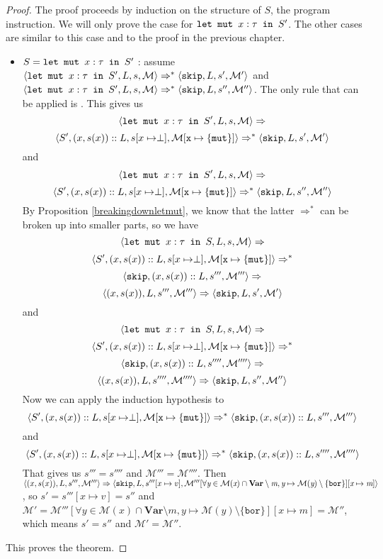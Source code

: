 \begin{proof}
The proof proceeds by induction on the structure of $S$, the program instruction. We will only prove the case for $\texttt{let mut }x : \tau \texttt{ in } S'$. The other cases are similar to this case and to the proof in the previous chapter. 
\begin{itemize}[noitemsep]
    
    \item $S = \texttt{let mut }x : \tau \texttt{ in } S'$ : assume $\langle \texttt{let mut }x : \tau \texttt{ in } S', L, s, \mathcal{M} \rangle \Rightarrow ^{*} \langle \texttt{skip}, L, s', \mathcal{M'} \rangle$ and $\langle \texttt{let mut }x : \tau \texttt{ in } S', L, s, \mathcal{M} \rangle \Rightarrow ^{*} \langle \texttt{skip}, L, s'', \mathcal{M''} \rangle$. The only rule that can be applied is . This gives us
    $$\langle \texttt{let mut }x : \tau \texttt{ in } S', L, s, \mathcal{M} \rangle \Rightarrow $$
    $$\langle S', (x,s(x))::L, s[x\mapsto \perp], \mathcal{M[\texttt{x}\mapsto\{\texttt{mut}\}]} \rangle \Rightarrow ^{*} \langle \texttt{skip}, L, s', \mathcal{M'} \rangle$$
    and 
    $$\langle \texttt{let mut }x : \tau \texttt{ in } S', L, s, \mathcal{M} \rangle \Rightarrow $$
    $$\langle S', (x,s(x))::L, s[x\mapsto \perp], \mathcal{M[\texttt{x}\mapsto\{\texttt{mut}\}]} \rangle \Rightarrow ^{*} \langle \texttt{skip}, L, s'', \mathcal{M''} \rangle$$
    By Proposition \ref{breakingdownletmut}, we know that the latter $\Rightarrow ^{*}$ can be broken up into smaller parts, so we have 
    $$\langle \texttt{let mut }x : \tau \texttt{ in } S, L, s, \mathcal{M} \rangle \Rightarrow $$
    $$\langle S', (x,s(x))::L, s[x\mapsto \perp], \mathcal{M[\texttt{x}\mapsto\{\texttt{mut}\}]} \rangle \Rightarrow ^{*}$$ $$\langle \texttt{skip}, (x,s(x))::L, s''', \mathcal{M'''} \rangle \Rightarrow$$ $$\langle (x,s(x)), L, s''', \mathcal{M'''} \rangle \Rightarrow \langle \texttt{skip}, L, s', \mathcal{M'} \rangle$$
    and 
    $$\langle \texttt{let mut }x : \tau \texttt{ in } S, L, s, \mathcal{M} \rangle \Rightarrow $$
    $$\langle S', (x,s(x))::L, s[x\mapsto \perp], \mathcal{M[\texttt{x}\mapsto\{\texttt{mut}\}]} \rangle \Rightarrow ^{*}$$ $$\langle \texttt{skip}, (x,s(x))::L, s'''', \mathcal{M''''} \rangle \Rightarrow$$ $$\langle (x,s(x)), L, s'''', \mathcal{M''''} \rangle \Rightarrow \langle \texttt{skip}, L, s'', \mathcal{M''} \rangle$$
    Now we can apply the induction hypothesis to 
    $$\langle S', (x,s(x))::L, s[x\mapsto \perp], \mathcal{M[\texttt{x}\mapsto\{\texttt{mut}\}]} \rangle \Rightarrow ^{*} \langle \texttt{skip}, (x,s(x))::L, s''', \mathcal{M'''} \rangle$$
    and 
    $$\langle S', (x,s(x))::L, s[x\mapsto \perp], \mathcal{M[\texttt{x}\mapsto\{\texttt{mut}\}]} \rangle \Rightarrow ^{*} \langle \texttt{skip}, (x,s(x))::L, s'''', \mathcal{M''''} \rangle$$
    That gives us $s''' = s''''$ and $\mathcal{M}''' = \mathcal{M}''''$. Then $\langle (x,s(x)), L, s''', \mathcal{M'''} \rangle \Rightarrow \langle \texttt{skip}, L, s'''[x\mapsto v], \mathcal{M'''[\forall \textit{y} \in M(\textit{x})\cap\textbf{Var} \setminus \textit{m}, \textit{y} \mapsto M(\textit{y}) \setminus \{\texttt{bor}\}][\textit{x}\mapsto \textit{m}]} \rangle$, so $s' = s'''[x\mapsto v] = s''$ and $\mathcal{M'} = \mathcal{M}'''[\forall \textit{y} \in \mathcal{M}(\textit{x})\cap\textbf{Var} \setminus m, y \mapsto \mathcal{M}(y) \setminus \{\texttt{bor}\}][x\mapsto m] = \mathcal{M''}$, which means $s'=s''$ and $\mathcal{M}' = \mathcal{M}''$.
\end{itemize}
This proves the theorem.
\end{proof}


